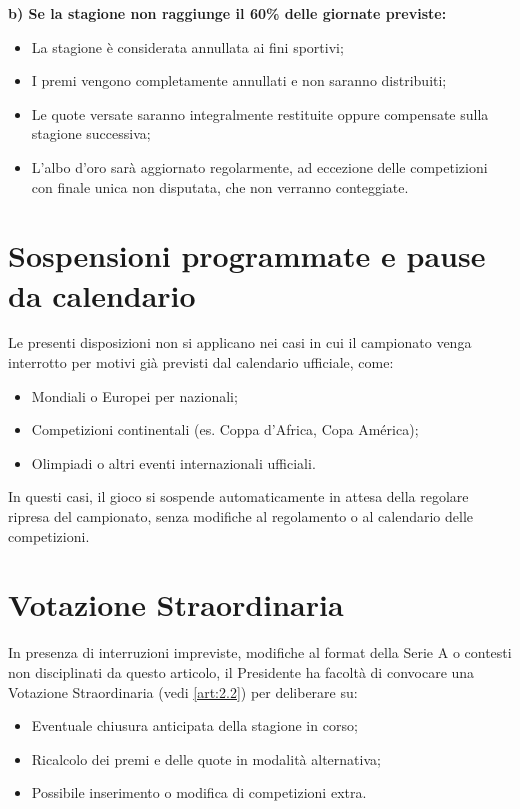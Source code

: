 \noindent
\textbf{b) Se la stagione non raggiunge il 60\% delle giornate previste:}
\begin{itemize}
\item La stagione è considerata annullata ai fini sportivi;
\item I premi vengono completamente annullati e non saranno distribuiti;
\item Le quote versate saranno integralmente restituite oppure compensate sulla stagione successiva;
\item L'albo d'oro sarà aggiornato regolarmente, ad eccezione delle competizioni con finale unica non disputata, che non verranno conteggiate.
\end{itemize}

\section{Sospensioni programmate e pause da calendario}
\label{art:8.3}
 
Le presenti disposizioni non si applicano nei casi in cui il campionato venga interrotto per motivi già previsti dal calendario ufficiale, come:
\begin{itemize}
\item Mondiali o Europei per nazionali;
\item Competizioni continentali (es. Coppa d'Africa, Copa América);
\item Olimpiadi o altri eventi internazionali ufficiali.
\end{itemize}

In questi casi, il gioco si sospende automaticamente in attesa della regolare ripresa del campionato, senza modifiche al regolamento o al calendario delle competizioni.

\section{Votazione Straordinaria}
\label{art:8.4}

In presenza di interruzioni impreviste, modifiche al format della Serie A o contesti non disciplinati da questo articolo, il Presidente ha facoltà di convocare una Votazione Straordinaria (vedi \ref{art:2.2}) per deliberare su:
\begin{itemize}
\item Eventuale chiusura anticipata della stagione in corso;
\item Ricalcolo dei premi e delle quote in modalità alternativa;
\item Possibile inserimento o modifica di competizioni extra.
\end{itemize}


